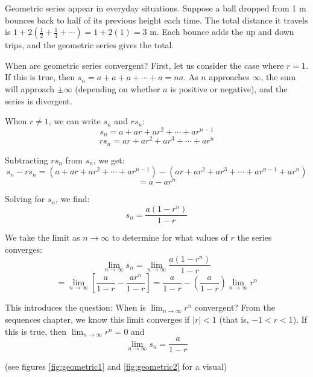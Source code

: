 Geometric series appear in everyday situations. Suppose a ball dropped from 1 m bounces back to half of its previous height each time. The total distance it travels is $1 + 2\left(\frac{1}{2} + \frac{1}{4} + \cdots\right) = 1 + 2(1) = 3$ m. Each bounce adds the up and down trips, and the geometric series gives the total.

When are geometric series convergent? First, let us consider the case
where $r=1$. If this is true, then $s_n = a + a + a + \cdots + a = 
na$. As $n$ approaches $\infty$, the sum will approach $\pm \infty$ 
(depending on whether $a$ is positive or negative), and the series is 
divergent. 

When $r \neq 1$, we can write $s_n$ and $rs_n$:
$$s_n = a + ar + ar^2 + \cdots + ar^{n-1}$$
$$rs_n = ar + ar^2 + ar^3 + \cdots + ar^n$$

Subtracting $rs_n$ from $s_n$, we get:
$$s_n - rs_n = (a + ar + ar^2 + \cdots + ar^{n-1}) - (ar + ar^2 + 
ar^3 + \cdots + ar^{n-1} + ar^n)$$
$$= a - ar^n$$

Solving for $s_n$, we find:
$$s_n = \frac{a(1-r^n)}{1-r}$$

We take the limit as $n \to \infty$ to determine for what values of 
$r$ the series converges:
$$\lim_{n \to \infty} s_n = \lim_{n \to \infty} \frac{a(1-r^n)}{1-r}$$
$$= \lim_{n\to \infty} \left[ \frac{a}{1-r} - \frac{ar^n}{1-r} \right] = \frac{a}{1-r} 
- \left( \frac{a}{1-r} \right) \lim_{n \to \infty} r^n$$

This introduces the question: When is $\lim_{n \to \infty} r^n$ convergent? 
From the sequences chapter, we know this limit converges if $|r| < 1$ 
(that is, $-1 < r < 1$). If this is true, then $\lim_{n \to \infty} 
r^n = 0$ and 
$$\lim_{n \to \infty} s_n = \frac{a}{1-r}$$

(see figures \ref{fig:geometric1} and \ref{fig:geometric2} for a visual)


